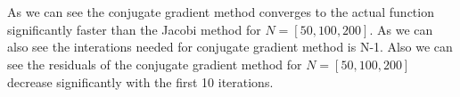 \documentclass[11pt]{article}
\begin{document}
    \begin{center}
    \end{center}
    { \hspace*{\fill} \\}
    
    \begin{center}
    \end{center}
    { \hspace*{\fill} \\}
    
    As we can see the conjugate gradient method converges to the actual
function significantly faster than the Jacobi method for
\(N=[50,100,200]\). As we can also see the interations needed for
conjugate gradient method is N-1. Also we can see the residuals of the
conjugate gradient method for \(N=[50,100,200]\) decrease significantly
with the first 10 iterations.


    
    
    
    
\end{document}
